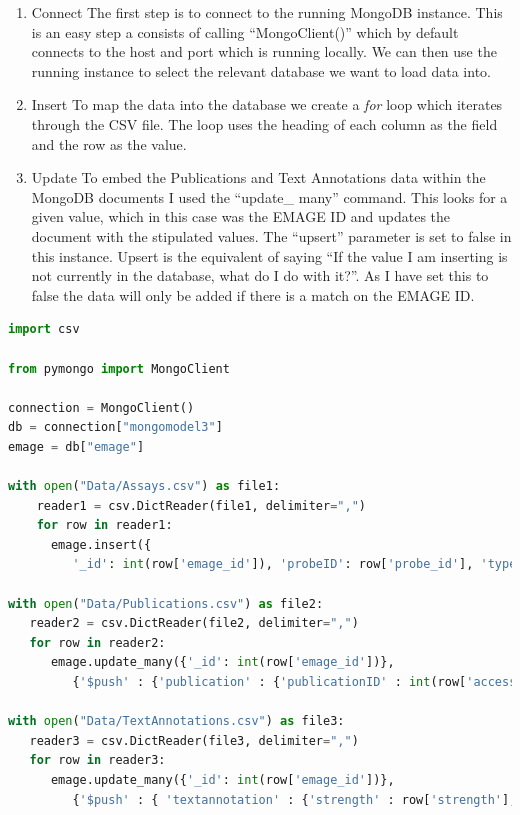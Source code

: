 \begin{enumerate}
\item Connect
The first step is to connect to the running MongoDB instance. This is an easy step a consists of calling ``MongoClient()'' which by default connects to the host and port which is running locally. We can then use the running instance to select the relevant database we want to load data into.
\item Insert
To map the data into the database we create a \textit{for} loop which iterates through the CSV file. The loop uses the heading of each column as the field and the row as the value.
\item Update
To embed the Publications and Text Annotations data within the MongoDB documents I used the ``update\_ many'' command. This looks for a given value, which in this case was the EMAGE ID and updates the document with the stipulated values. The ``upsert'' parameter is set to false in this instance. Upsert is the equivalent of saying ``If the value I am inserting is not currently in the database, what do I do with it?''. As I have set this to false the data will only be added if there is a match on the EMAGE ID.
\end{enumerate}
\newpage
\vspace*{\fill}
\begin{lstlisting}[language=Python, caption=PyMongo script implemented to load data into MongoDB., label=code:pymongo]
import csv

from pymongo import MongoClient

connection = MongoClient()
db = connection["mongomodel3"]
emage = db["emage"]

with open("Data/Assays.csv") as file1:
    reader1 = csv.DictReader(file1, delimiter=",")
    for row in reader1:
      emage.insert({
         '_id': int(row['emage_id']), 'probeID': row['probe_id'], 'type': row['assay_type'], 'source': row['name'], 'specimen' : {'type':row['type'],'strain' : row['strain']}, 'stage' : {'theilerstage' : int(row['theilerstage']),'dpc' : row['dpc']}})
         
with open("Data/Publications.csv") as file2:
   reader2 = csv.DictReader(file2, delimiter=",")
   for row in reader2:
      emage.update_many({'_id': int(row['emage_id'])},
         {'$push' : {'publication' : {'publicationID' : int(row['accession']), 'title' : row['title'], 'author' : row['author']}}}, upsert=False)
         
with open("Data/TextAnnotations.csv") as file3:
   reader3 = csv.DictReader(file3, delimiter=",")
   for row in reader3:
      emage.update_many({'_id': int(row['emage_id'])},
         {'$push' : { 'textannotation' : {'strength' : row['strength'], 'anatomystructure' : {'structureID' : int(row['EMAPA']),'term' : row['term']}, 'gene' : {'geneID' : row['accession'],'name' : row['name']}}}}, upsert=False)
\end{lstlisting}
\vspace*{\fill}
\newpage
